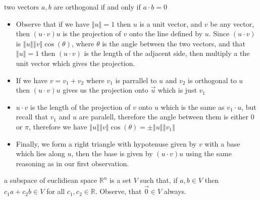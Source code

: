 \documentclass[11pt]{book}
\begin{document}
\begin{defn}[Orthogonality]\label{defn:orthogonality}
    two vectors $a,b$ are orthogonal if and only if $a \cdot b= 0$ 
\end{defn}
\begin{itemize}
    \item Observe that if we have $\left\Vert u \right\Vert = 1$ then $u$ is a unit vector, and $v$ be any vector, then $\left( u \cdot v \right) u$ is the projection of $v$ onto the line defined by $u$. Since $\left( u \cdot v \right) $ is $\left\Vert u \right\Vert \left\Vert v \right\Vert \cos  \left( \theta \right) $, where $\theta $ is the angle between the two vectors, and that $\left\Vert u \right\Vert = 1$ then $\left( u \cdot v \right) $ is the length of the adjacent side, then multiply a the unit vector which gives the projection.  
    \item If we have $v = v_1 + v_2$ where $v_1$ is parrallel to $u$ and $v_2$ is orthogonal to $u$ then $\left( u \cdot v \right) u$ gives us the projection onto $\vec{u} $ which is just $v_{1} $
        \item $u \cdot v$ is the length of the projection of $v$ onto $u$ which is the same as $v_1 \cdot u$, but recall that $v_1$ and $u$ are paralell, therefore the angle between them is either $0$ or $\pi $,  therefore we have $\left\Vert u \right\Vert \left\Vert v \right\Vert \cos \left( \theta \right) = \pm \left\Vert u \right\Vert \left\Vert v_1 \right\Vert $   
        \item Finally, we form a right triangle with hypotenuse given by $v$ with a base which lies along $u$, then the base is given by $\left( u \cdot v \right) u$ using the same reasoning as in our first observation.
\end{itemize}

\begin{defn}[Subspace]\label{defn:subspace}
    a subspace of euclidiean space $\mathbb{R} ^{n} $ is a set $V$ such that, if $a, b \in V$ then $c_1a + c_2b \in V$ for all $c_1, c_2\in  \mathbb{R} $. Observe, that $\vec{0} \in V$ always. 
\end{defn}
\end{document}

